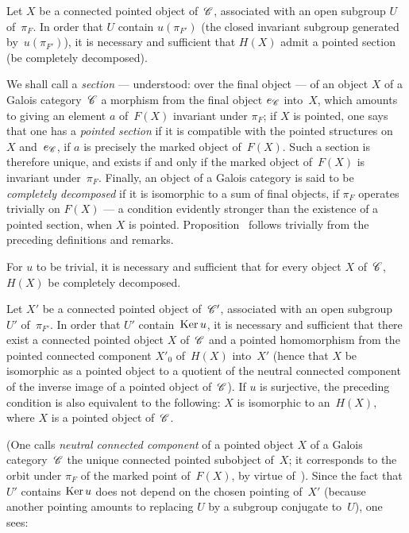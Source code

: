 \begin{proposition}
\label{V.6.4}
Let $X$ be a connected pointed object of~$\cal{C}$, associated with
an open subgroup $U$ of~$\pi_F$. In order that
$U$
contain $u(\pi_{F'})$ (\resp the closed invariant subgroup
generated by~$u(\pi_{F'})$), it is necessary and sufficient that $H(X)$
admit a pointed section (\resp be completely
decomposed).
\end{proposition}

We shall call a \emph{section} --- understood: over the final
object --- of an object $X$ of a Galois category~$\cal{C}$ a
morphism from the final object $e_{\cal{C}}$ into~$X$, which amounts
to giving an element $a$ of~$F(X)$ invariant under
$\pi_F$; if $X$ is pointed, one says that one has a \emph{pointed
section} if it is compatible with the pointed structures
on~$X$ and~$e_{\cal{C}}$, \ie if $a$ is precisely the marked
object of~$F(X)$. Such a section is therefore unique, and exists if
and only if the marked object of~$F(X)$ is invariant
under~$\pi_F$. Finally, an object of a Galois category is said to be
\emph{completely decomposed}
if it is isomorphic to a sum of final objects, \ie if $\pi_F$
operates trivially on $F(X)$ --- a condition evidently
stronger than the existence of a pointed section, when $X$ is
pointed. Proposition~ follows trivially from the
preceding definitions and remarks.

\begin{corollary}
\label{V.6.5}
For
$u$ to be trivial, it is necessary and sufficient that for every object
$X$ of~$\cal{C}$, $H(X)$ be completely decomposed.
\end{corollary}

\begin{proposition}
\label{V.6.6}
Let $X'$ be a connected pointed object of~${\cal{C}}'$, associated
with an open subgroup $U'$ of~$\pi_{F'}$. In order that $U'$
contain~$\operatorname{Ker} u$, it is necessary and sufficient that there exist a
connected pointed object $X$ of~$\cal{C}$ and a pointed homomorphism
from the pointed connected component $X'_0$ of~$H(X)$ into~$X'$ (hence
that $X$ be isomorphic as a pointed object to a quotient of the
neutral connected component of the inverse image of a pointed object
of~$\cal{C}$). If $u$ is surjective, the preceding condition
is also equivalent to the following: $X$ is isomorphic to
an~$H(X)$, where $X$ is a pointed object of~$\cal{C}$.
\end{proposition}

(One calls \emph{neutral connected component}
of a pointed object $X$ of a Galois category~$\cal{C}$
the unique connected pointed subobject of~$X$; it corresponds to the
orbit under $\pi_F$ of the marked point of~$F(X)$, by virtue
of~). Since the fact that $U'$ contains $\operatorname{Ker} u$ does not
depend on the chosen pointing of~$X'$ (because another
pointing amounts to replacing $U$ by a subgroup
conjugate to~$U$), one sees:

